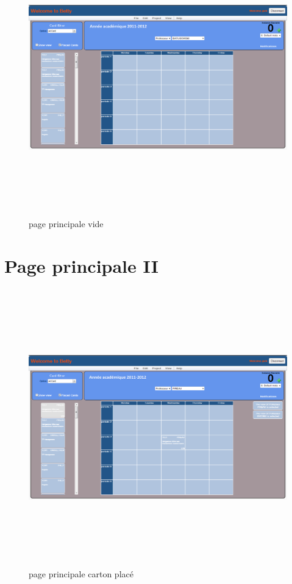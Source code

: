 \begin{figure}[!h]
	\begin{center}
		\includegraphics[width=19cm,height=12cm,angle=90]{MainPageClean.png}
		\caption{page principale vide}
	\end{center}
\end{figure}

\newpage

\section{Page principale II}
\label{annexe/espace_nom}

\begin{figure}[!h]
	\begin{center}
		\includegraphics[width=19cm,height=12cm,angle=90]{MainPagePlacedCard.png}
		\caption{page principale carton placé}
	\end{center}
\end{figure}

